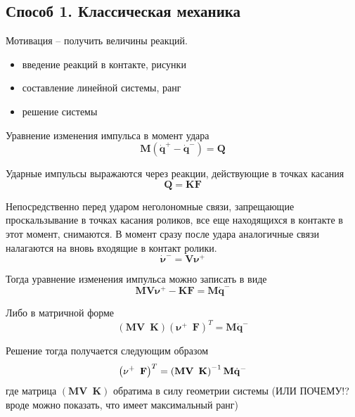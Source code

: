 \subsection{Способ 1. Классическая механика}

Мотивация -- получить величины реакций.

\begin{itemize}
    \item введение реакций в контакте, рисунки
    \item составление линейной системы, ранг
    \item решение системы
\end{itemize}

Уравнение изменения импульса в момент удара
\begin{equation*}
\mathbf{M} (\dot{\mathbf{q}}^+ - \dot{\mathbf{q}}^-) = \mathbf{Q}
\end{equation*}

Ударные импульсы выражаются через реакции, действующие в точках касания
\begin{equation*}
\mathbf{Q} = \mathbf{K}\mathbf{F}
\end{equation*}

Непосредственно перед ударом неголономные связи, запрещающие проскальзывание в точках касания роликов, все еще находящихся в контакте в этот момент, снимаются.
В момент сразу после удара аналогичные связи налагаются на вновь входящие в контакт ролики.
\begin{equation*}
\dot{\mathbf{\nu}}^- = \mathbf{V}\mathbf{\nu}^+
\end{equation*}

Тогда уравнение изменения импульса можно записать в виде
\begin{equation*}
\mathbf{M}\mathbf{V}\mathbf{\nu}^+ - \mathbf{K}\mathbf{F} = \mathbf{M}\dot{\mathbf{q}}^-
\end{equation*}

Либо в матричной форме
\begin{equation*}
\left(\mathbf{M}\mathbf{V} \enspace \mathbf{K}\right) \left(\mathbf{\nu}^+ \enspace \mathbf{F}\right)^T = \mathbf{M}\dot{\mathbf{q}}^-
\end{equation*}

Решение тогда получается следующим образом
\begin{equation*}
\left(\mathbf{\nu}^+ \enspace \mathbf{F}\right)^T = \left( \mathbf{M}\mathbf{V} \enspace \mathbf{K} \right)^{-1} \mathbf{M}\dot{\mathbf{q}}^-
\end{equation*}
где матрица $\left(\mathbf{M}\mathbf{V} \enspace \mathbf{K}\right)$ обратима в силу геометрии системы (ИЛИ ПОЧЕМУ!? вроде можно показать, что имеет максимальный ранг)

